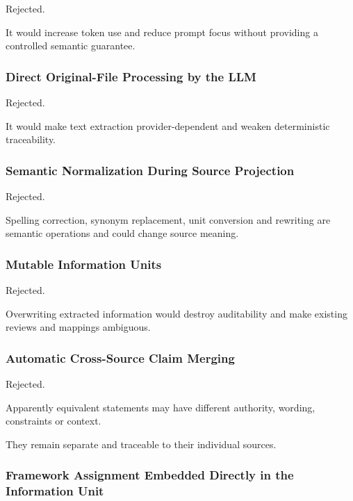 Rejected.

It would increase token use and reduce prompt focus without providing a controlled semantic guarantee.

\hypertarget{direct-original-file-processing-by-the-llm}{%
\subsubsection{Direct Original-File Processing by the LLM}\label{direct-original-file-processing-by-the-llm}}

Rejected.

It would make text extraction provider-dependent and weaken deterministic traceability.

\hypertarget{semantic-normalization-during-source-projection}{%
\subsubsection{Semantic Normalization During Source Projection}\label{semantic-normalization-during-source-projection}}

Rejected.

Spelling correction, synonym replacement, unit conversion and rewriting are semantic operations and could change source meaning.

\hypertarget{mutable-information-units}{%
\subsubsection{Mutable Information Units}\label{mutable-information-units}}

Rejected.

Overwriting extracted information would destroy auditability and make existing reviews and mappings ambiguous.

\hypertarget{automatic-cross-source-claim-merging}{%
\subsubsection{Automatic Cross-Source Claim Merging}\label{automatic-cross-source-claim-merging}}

Rejected.

Apparently equivalent statements may have different authority, wording, constraints or context.

They remain separate and traceable to their individual sources.

\hypertarget{framework-assignment-embedded-directly-in-the-information-unit}{%
\subsubsection{Framework Assignment Embedded Directly in the Information Unit}\label{framework-assignment-embedded-directly-in-the-information-unit}}


